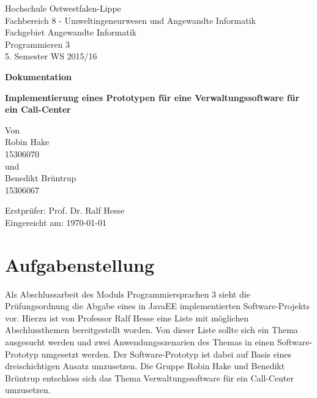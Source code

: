 \documentclass[12pt, a4paper]{article}
\begin{document}
\begin{titlepage}
Hochschule Ostwestfalen-Lippe \\
Fachbereich 8 - Umweltingeneurwesen und Angewandte Informatik \\
Fachgebiet Angewandte Informatik \\
Programmieren 3 \\
5. Semester WS 2015/16\\
\vspace{2cm}

\begin{center}
\begin{Large}
\textbf{Dokumentation} \\
\end{Large}
\vspace{2cm}

\begin{Large}
\textbf {Implementierung eines Prototypen für eine Verwaltungssoftware für ein Call-Center} \\[0.35cm]
\end{Large}
Von \\[0.35cm]
Robin Hake \\
15306070 \\[0.35cm]
und\\[0.35cm]
Benedikt Brüntrup \\
15306067 \\[0.35cm]
\end{center}

\vfill
Erstprüfer: Prof. Dr. Ralf Hesse \\
Eingereicht am: {\today}
\end{titlepage}

\newpage
\tableofcontents


\vfill
\newpage


\section{Aufgabenstellung}
Als Abschlussarbeit des Moduls \glqq Programmiersprachen 3\grqq{} sieht die Prüfungsordnung die Abgabe eines in JavaEE implementierten Software-Projekts vor. Hierzu ist von Professor Ralf Hesse eine Liste mit möglichen Abschlussthemen bereitgestellt worden. Von dieser Liste sollte sich ein Thema ausgesucht werden und zwei Anwendungsszenarien des Themas in einen Software-Prototyp umgesetzt werden. Der Software-Prototyp ist dabei auf Basis eines dreischichtigen Ansatz umzusetzen.  Die Gruppe Robin Hake und Benedikt Brüntrup entschloss sich das Thema \glqq Verwaltungssoftware für ein Call-Center\grqq{} umzusetzen.
\end{document}
